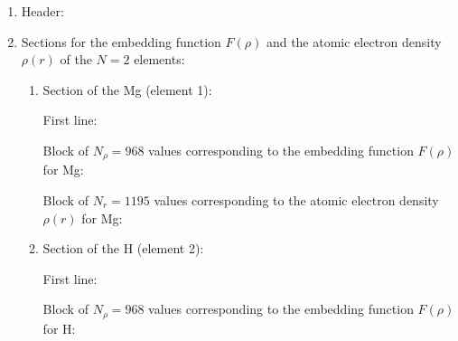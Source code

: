 \documentclass{article}
\begin{document}
	\begin{enumerate}
		\item Header:
		\lstset{style=mystyle}
		\item  Sections for the embedding function $F(\rho)$ and the atomic electron density $\rho(r)$ of the $N=2$ elements:
		
		
		\begin{enumerate}
			\item Section of the Mg (element 1):
			
			First line:
			
			Block of $N_{\rho}=968$ values corresponding to the embedding function $F(\rho)$ for Mg:
			
			Block of $N_{r}=1195$ values corresponding to the atomic electron density $\rho(r)$ for Mg:
			
			\item Section of the H (element 2):
			
			First line:
			
			Block of $N_{\rho}=968$ values corresponding to the embedding function $F(\rho)$ for H:
			

\end{enumerate}
\end{enumerate}
\end{document}
